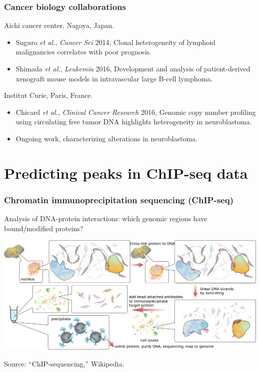 \documentclass{beamer}
\begin{document}
\begin{frame}
  \frametitle{Cancer biology collaborations}
  Aichi cancer center, Nagoya, Japan.
  \begin{itemize}
  \item Suguro {\it et al.}, {\it Cancer Sci} 2014, Clonal
    heterogeneity of lymphoid malignancies correlates with poor
    prognosis.
  \item Shimada {\it et al.}, {\it Leukemia} 2016, Development and
    analysis of patient-derived xenograft mouse models in
    intravascular large B-cell lymphoma.
  \end{itemize}
  Institut Curie, Paris, France.
  \begin{itemize}
  \item Chicard {\it et al.}, {\it Clinical Cancer Research} 2016,
    Genomic copy number profiling using circulating free tumor DNA
    highlights heterogeneity in neuroblastoma.
  \item Ongoing work, characterizing alterations in neuroblastoma.
  \end{itemize}
\end{frame}

\section{Predicting peaks in ChIP-seq data}

\begin{frame}
  \frametitle{Chromatin immunoprecipitation sequencing (ChIP-seq)}
  Analysis of DNA-protein interactions: which genomic regions have
  bound/modified proteins?

  \includegraphics[width=\textwidth]{Chromatin_immunoprecipitation_sequencing_wide.png}

  Source: ``ChIP-sequencing,'' Wikipedia.
\end{frame}

\end{document}
